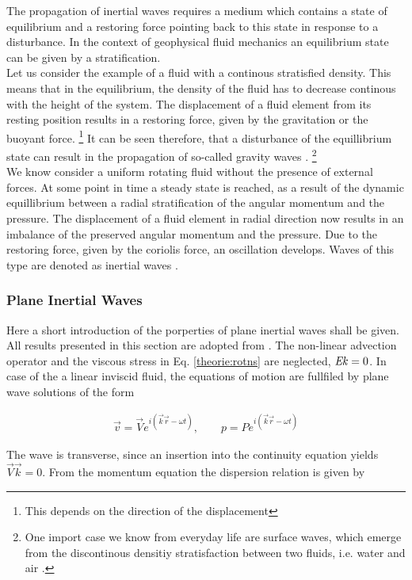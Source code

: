 The propagation of inertial waves requires a medium which contains a state of equilibrium and
a restoring force pointing back to this state in response to a disturbance.
In the context of geophysical fluid mechanics an equilibrium state can be given by a stratification.\\
Let us consider the example of a fluid with a continous stratisfied density.
This means that in the equilibrium, the density of the fluid has to decrease
continous with the height of the system. The displacement of a fluid element
 from its resting position results in a restoring force, given by the
gravitation or the buoyant force.
\footnote{This depends on the direction of the displacement}
It can be seen therefore, that a disturbance of the equillibrium state can result in the
propagation of so-called  gravity waves \cite{Clausen2011}.
\footnote{One import case we know from everyday life are surface waves, which emerge
from the discontinous densitiy stratisfaction between two fluids, i.e. water and air \cite{Clausen2011}.}\\
We know consider a uniform rotating fluid without the presence of external forces.
At some point in time a steady state is reached, as a result of the dynamic equillibrium between
a radial stratification of the angular momentum and the pressure.
The displacement of a fluid element in radial direction now results in
an imbalance of the preserved angular momentum and the pressure.
Due to the restoring force, given by the coriolis force, an oscillation develops.
Waves of this type are denoted as inertial waves \cite{Clausen2011}.

\subsubsection{Plane Inertial Waves}

Here a short introduction of the porperties of plane inertial waves shall be given.
All results presented in this section are adopted from \citep{Greenspan1990}.%
The non-linear advection operator and the viscous stress in Eq. \ref{theorie:rotns} are neglected, $\mbox{\textit{Ek}} =0$.
In case of the a linear inviscid fluid, the equations of motion are fullfiled by plane wave solutions of the form

\begin{align}
    \vec{v} = \vec{V} e^{i(\vec{k}\vec{r}  - \omega t )}, \qquad
    p = P e^{i(\vec{k}\vec{r}  - \omega t )}
\end{align}

The wave is transverse, since an insertion into the continuity equation yields $\vec{V}\vec{k} = 0$.
From the momentum equation the dispersion relation is given by

